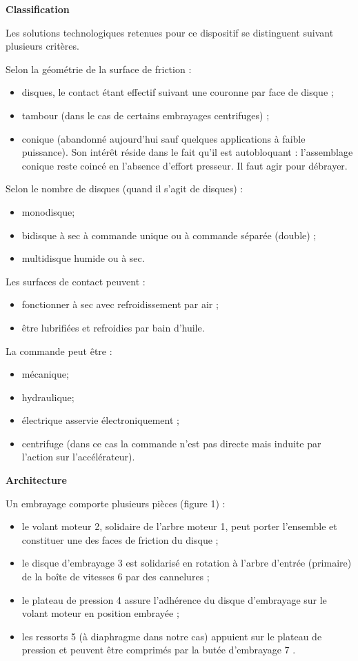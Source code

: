 \textbf{Classification}

Les solutions technologiques retenues pour ce dispositif se distinguent suivant plusieurs critères.

Selon la géométrie de la surface de friction :
\begin{itemize}
\item disques, le contact étant effectif suivant une couronne par face de disque ;
\item tambour (dans le cas de certains embrayages centrifuges) ;
\item conique (abandonné aujourd'hui sauf quelques applications à faible puissance). Son intérêt réside dans le fait qu'il est autobloquant : l'assemblage conique reste coincé en l'absence d'effort presseur. Il faut agir pour débrayer.
\end{itemize}

Selon le nombre de disques (quand il s'agit de disques) :
\begin{itemize}
\item monodisque;
\item bidisque à sec à commande unique ou à commande séparée (double) ;
\item multidisque humide ou à sec.
\end{itemize}

Les surfaces de contact peuvent :
\begin{itemize}
\item fonctionner à sec avec refroidissement par air ;
\item être lubrifiées et refroidies par bain d'huile.
\end{itemize}

\newpage
La commande peut être :
\begin{itemize}
\item mécanique;
\item hydraulique;
\item électrique asservie électroniquement ;
\item centrifuge (dans ce cas la commande n'est pas directe mais induite par l'action sur l'accélérateur).
\end{itemize}

\textbf{Architecture}

Un embrayage comporte plusieurs pièces (figure 1) :
\begin{itemize}
\item le volant moteur 2, solidaire de l'arbre moteur 1, peut porter l'ensemble et constituer une des faces de friction du disque ;
\item le disque d'embrayage 3 est solidarisé en rotation à l'arbre d'entrée (primaire) de la boîte de vitesses 6 par des cannelures ;
\item le plateau de pression 4 assure l'adhérence du disque d'embrayage sur le volant moteur en position embrayée ;
\item les ressorts 5 (à diaphragme dans notre cas) appuient sur le plateau de pression et peuvent être comprimés par la butée d'embrayage 7 .
\end{itemize}

